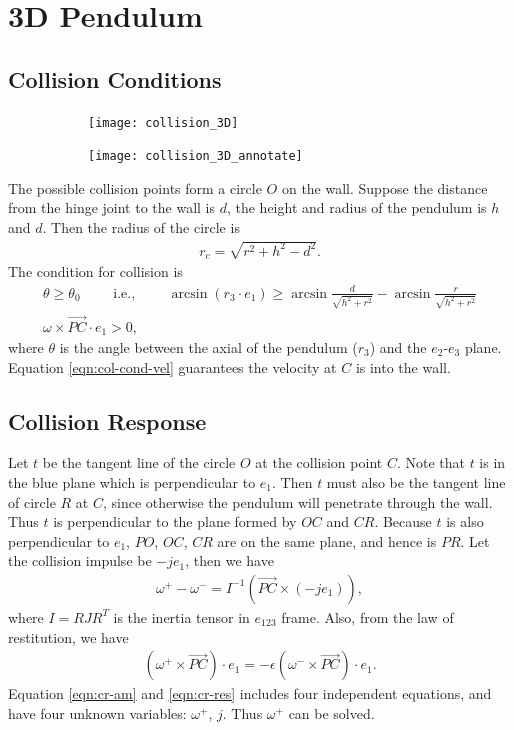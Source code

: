 \documentclass[10pt]{article}
\begin{document}
\section{3D Pendulum}

\subsection{Collision Conditions}

\begin{figure}
	\centering
	\begin{subfigure}{0.49\textwidth}
		\texttt{[image: collision\_3D]}
	\end{subfigure}
	\begin{subfigure}{0.49\textwidth}
		\texttt{[image: collision\_3D\_annotate]}
	\end{subfigure}
\end{figure}

The possible collision points form a circle $O$ on the wall.
Suppose the distance from the hinge joint to the wall is $d$, the height and radius of the pendulum is $h$ and $d$.
Then the radius of the circle is
\begin{align}
	r_{c} = \sqrt{r^2+h^2-d^2}.
\end{align}
The condition for collision is 
\begin{gather}
	\theta \geq \theta_0 \qquad \text{ i.e., } \qquad \arcsin(r_3 \cdot e_1) \geq \arcsin\frac{d}{\sqrt{h^2+r^2}} - \arcsin\frac{r}{\sqrt{h^2+r^2}} \\
	\omega \times \vec{PC} \cdot e_1 > 0, \label{eqn:col-cond-vel}
\end{gather}
where $\theta$ is the angle between the axial of the pendulum ($r_3$) and the $e_2$-$e_3$ plane.
Equation \eqref{eqn:col-cond-vel} guarantees the velocity at $C$ is into the wall.

\subsection{Collision Response}

Let $t$ be the tangent line of the circle $O$ at the collision point $C$.
Note that $t$ is in the blue plane which is perpendicular to $e_1$.
Then $t$ must also be the tangent line of circle $R$ at $C$, since otherwise the pendulum will penetrate through the wall.
Thus $t$ is perpendicular to the plane formed by $OC$ and $CR$.
Because $t$ is also perpendicular to $e_1$, $PO$, $OC$, $CR$ are on the same plane, and hence is $PR$.
Let the collision impulse be $-je_1$, then we have
\begin{align} \label{eqn:cr-am}
	\omega^+ - \omega^- = I^{-1}\left( \vec{PC} \times (-je_1) \right),
\end{align}
where $I = RJR^T$ is the inertia tensor in $e_{123}$ frame.
Also, from the law of restitution, we have
\begin{align} \label{eqn:cr-res}
	(\omega^+\times \vec{PC}) \cdot e_1 = -\epsilon (\omega^- \times \vec{PC}) \cdot e_1.
\end{align}
Equation \eqref{eqn:cr-am} and \eqref{eqn:cr-res} includes four independent equations, and have four unknown variables: $\omega^+$, $j$.
Thus $\omega^+$ can be solved.
\end{document}
